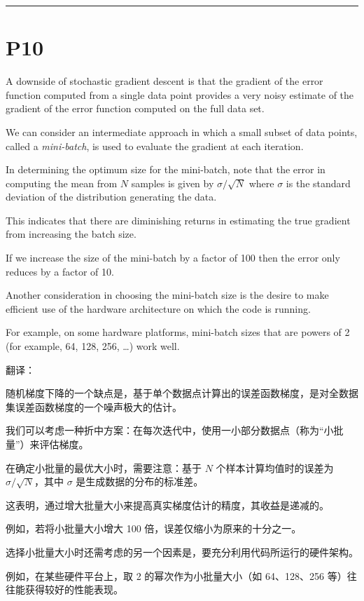 \documentclass{article}
\begin{document}
\noindent\rule{\linewidth}{0.4pt}

\section{P10}%

A downside of stochastic gradient descent is that the gradient of the error function computed from a single data point provides a very noisy estimate of the gradient of the error function computed on the full data set. 

We can consider an intermediate approach in which a small subset of data points, called a \emph{mini-batch}, is used to evaluate the gradient at each iteration. 

In determining the optimum size for the mini-batch, note that the error in computing the mean from $N$ samples is given by $\sigma/\sqrt{N}$ where $\sigma$ is the standard deviation of the distribution generating the data. 

This indicates that there are diminishing returns in estimating the true gradient from increasing the batch size. 

If we increase the size of the mini-batch by a factor of 100 then the error only reduces by a factor of 10. 

Another consideration in choosing the mini-batch size is the desire to make efficient use of the hardware architecture on which the code is running. 

For example, on some hardware platforms, mini-batch sizes that are powers of 2 (for example, 64, 128, 256, \dots) work well.

{\color{red}
翻译：

随机梯度下降的一个缺点是，基于单个数据点计算出的误差函数梯度，是对全数据集误差函数梯度的一个噪声极大的估计。

我们可以考虑一种折中方案：在每次迭代中，使用一小部分数据点（称为“小批量”）来评估梯度。

在确定小批量的最优大小时，需要注意：基于 $N$ 个样本计算均值时的误差为 $\sigma/\sqrt{N}$，其中 $\sigma$ 是生成数据的分布的标准差。

这表明，通过增大批量大小来提高真实梯度估计的精度，其收益是递减的。

例如，若将小批量大小增大 100 倍，误差仅缩小为原来的十分之一。

选择小批量大小时还需考虑的另一个因素是，要充分利用代码所运行的硬件架构。

例如，在某些硬件平台上，取 2 的幂次作为小批量大小（如 64、128、256 等）往往能获得较好的性能表现。
}
\end{document}
